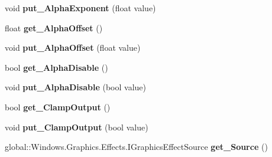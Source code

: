 \begin{DoxyCompactItemize}
void {\bfseries put\+\_\+\+Alpha\+Exponent} (float value)
\item 
\mbox{\label{class_microsoft_1_1_graphics_1_1_canvas_1_1_effects_1_1_gamma_transfer_effect_a9cd411aefae383f0bb5376e6c9e6eaad}} 
float {\bfseries get\+\_\+\+Alpha\+Offset} ()
\item 
\mbox{\label{class_microsoft_1_1_graphics_1_1_canvas_1_1_effects_1_1_gamma_transfer_effect_ae92a33578f4b1e8c7ef44afc2dd914b2}} 
void {\bfseries put\+\_\+\+Alpha\+Offset} (float value)
\item 
\mbox{\label{class_microsoft_1_1_graphics_1_1_canvas_1_1_effects_1_1_gamma_transfer_effect_ac99e552d17e439e01b9d30bd336d3cad}} 
bool {\bfseries get\+\_\+\+Alpha\+Disable} ()
\item 
\mbox{\label{class_microsoft_1_1_graphics_1_1_canvas_1_1_effects_1_1_gamma_transfer_effect_ae37bb6d2650bbe21081907b456fdaa91}} 
void {\bfseries put\+\_\+\+Alpha\+Disable} (bool value)
\item 
\mbox{\label{class_microsoft_1_1_graphics_1_1_canvas_1_1_effects_1_1_gamma_transfer_effect_a5a4f8fba325b4ab2ea79efe633af07c5}} 
bool {\bfseries get\+\_\+\+Clamp\+Output} ()
\item 
\mbox{\label{class_microsoft_1_1_graphics_1_1_canvas_1_1_effects_1_1_gamma_transfer_effect_aa0ea4517855831f3f871ce91779f071c}} 
void {\bfseries put\+\_\+\+Clamp\+Output} (bool value)
\item 
\mbox{\label{class_microsoft_1_1_graphics_1_1_canvas_1_1_effects_1_1_gamma_transfer_effect_a0a4fdf6b62a6e86407013ef990cbada3}} 
global\+::\+Windows.\+Graphics.\+Effects.\+I\+Graphics\+Effect\+Source {\bfseries get\+\_\+\+Source} ()
\item 

\end{DoxyCompactItemize}
